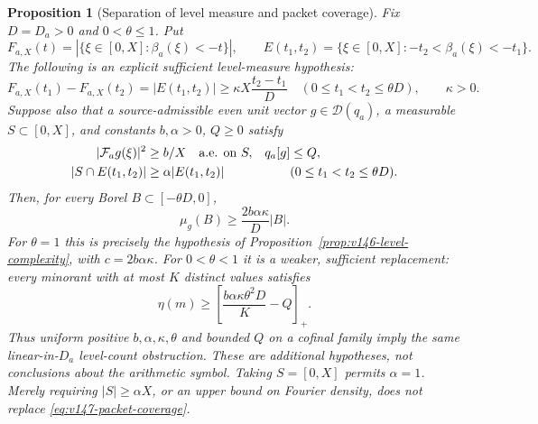 \documentclass[11pt]{article}
\newtheorem{proposition}[theorem]{Proposition}
\theoremstyle{remark}
\begin{document}
\begin{proposition}[Separation of level measure and packet coverage]
\label{prop:v147-level-separation}
Fix $D=D_a>0$ and $0<\theta\le1$. Put
\[
 F_{a,X}(t)=|\{\xi\in[0,X]:\beta_a(\xi)<-t\}|,
 \qquad E(t_1,t_2)=\{\xi\in[0,X]:-t_2<\beta_a(\xi)<-t_1\}.
\]
The following is an explicit sufficient level-measure hypothesis:
\begin{equation}\label{eq:v147-level-increments}
 F_{a,X}(t_1)-F_{a,X}(t_2)
 =|E(t_1,t_2)|\ge\kappa X\frac{t_2-t_1}{D}
 \quad(0\le t_1<t_2\le\theta D),\qquad\kappa>0.
\end{equation}
Suppose also that a source-admissible even unit vector
$g\in\mathcal D(q_a)$, a measurable $S\subset[0,X]$, and constants
$b,\alpha>0$, $Q\ge0$ satisfy
\begin{align}
 |\mathcal F_ag(\xi)|^2&\ge b/X\quad\hbox{a.e. on }S,
 &q_a[g]&\le Q, \notag\\
 |S\cap E(t_1,t_2)|&\ge\alpha|E(t_1,t_2)|
 &&(0\le t_1<t_2\le\theta D).
 \label{eq:v147-packet-coverage}
\end{align}
Then, for every Borel $B\subset[-\theta D,0]$,
\begin{equation}\label{eq:v147-weighted-density}
 \mu_g(B)\ge\frac{2b\alpha\kappa}{D}|B|.
\end{equation}
For $\theta=1$ this is precisely the hypothesis of
Proposition~\ref{prop:v146-level-complexity}, with $c=2b\alpha\kappa$.
For $0<\theta<1$ it is a weaker, sufficient replacement: every minorant
with at most $K$ distinct values satisfies
\begin{equation}\label{eq:v147-partial-level-loss}
 \eta(m)\ge\left[\frac{b\alpha\kappa\theta^2D}{K}-Q\right]_+.
\end{equation}
Thus uniform positive $b,\alpha,\kappa,\theta$ and bounded $Q$ on a
cofinal family imply the same linear-in-$D_a$ level-count obstruction.
These are additional hypotheses, not conclusions about the arithmetic
symbol. Taking $S=[0,X]$ permits $\alpha=1$. Merely requiring
$|S|\ge\alpha X$, or an upper bound on Fourier density, does not
replace \eqref{eq:v147-packet-coverage}.
\end{proposition}
\end{document}
